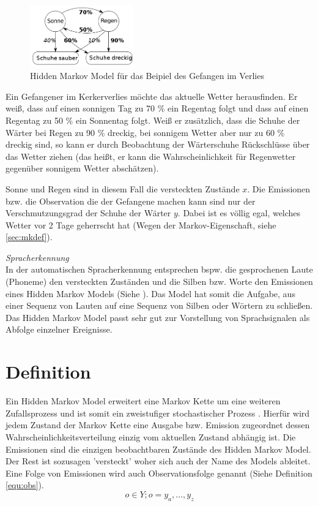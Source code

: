 \begin{figure}[htbp] \centering
    \includegraphics[width=0.4\textwidth]{Bilder/Kap3/hmm_example.png}
    \caption{Hidden Markov Model für das Beipiel des Gefangen im Verlies}
    \label{fig:hmm_example}
\end{figure}

Ein Gefangener im Kerkerverlies möchte das aktuelle Wetter herausfinden. Er weiß, dass auf einen sonnigen Tag zu 70 \% ein Regentag folgt und dass auf einen Regentag zu 50 \% ein Sonnentag folgt. Weiß er zusätzlich, dass die Schuhe der Wärter bei Regen zu 90 \% dreckig, bei sonnigem Wetter aber nur zu 60 \% dreckig sind, so kann er durch Beobachtung der Wärterschuhe Rückschlüsse über das Wetter ziehen (das heißt, er kann die Wahrscheinlichkeit für Regenwetter gegenüber sonnigem Wetter abschätzen). 

Sonne und Regen sind in diesem Fall die versteckten Zustände $x$. Die  Emissionen bzw. die Observation die der Gefangene machen kann sind nur der Verschmutzungsgrad der Schuhe der Wärter $y$. Dabei ist es völlig egal, welches Wetter vor 2 Tage geherrscht hat (Wegen der Markov-Eigenschaft, siehe \ref{sec:mkdef}).

\textit{ Spracherkennung } \\
In der automatischen Spracherkennung entsprechen bspw. die gesprochenen Laute  (Phoneme) den versteckten Zuständen und die Silben bzw. Worte den Emissionen eines Hidden Markov Models (Siehe \cite{speech}). 
Das Model hat somit die Aufgabe, aus einer Sequenz von Lauten auf eine Sequenz von Silben oder Wörtern zu schließen.
Das Hidden Markov Model passt sehr gut zur Vorstellung von Sprachsignalen als Abfolge einzelner Ereignisse.



\section{Definition}
Ein Hidden Markov Model erweitert eine Markov Kette um eine weiteren Zufallsprozess und ist somit ein zweistufiger stochastischer Prozess \cite[67]{mmmFink}. Hierfür wird jedem Zustand der Markov Kette eine Ausgabe bzw. Emission zugeordnet dessen Wahrscheinlichkeitsverteilung einzig vom aktuellen Zustand abhängig ist. Die Emissionen sind die einzigen beobachtbaren Zustände des Hidden Markov Model. Der Rest ist sozusagen 'versteckt' woher sich auch der Name des Models ableitet. Eine Folge von Emissionen wird auch Observationsfolge genannt (Siehe Definition \ref{equ:obs}).
\begin{equation}
\label{equ:obs}
o \in Y; o = y_a, \ldots, y_z
\end{equation}


